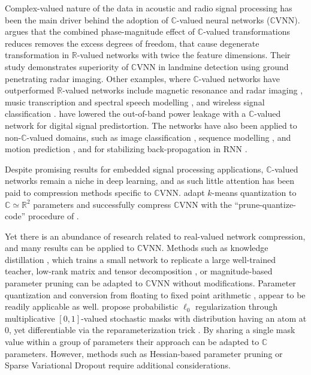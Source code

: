 \documentclass[a4paper,10pt,twocolumn]{article}
\newcommand{\real}{\mathbb{R}}
\newcommand{\cplx}{\mathbb{C}}
\begin{document}
Complex-valued nature of the data in acoustic and radio signal processing has been
the main driver behind the adoption of $\cplx$-valued neural networks ($\cplx$VNN).
\citet{hirose_complex-valued_2009} argues that the combined phase-magnitude effect of
$\cplx$-valued transformations reduces removes the excess degrees of freedom, that cause
degenerate transformation in $\real$-valued networks with twice the feature dimensions.
Their study demonstrates superiority of $\cplx$VNN in landmine detection using ground
penetrating radar imaging. Other examples, where $\cplx$-valued networks have outperformed
$\real$-valued networks include magnetic resonance \citep{hui_mri_1995,wang_deepcomplexmri_2020}
and radar imaging \citep{haensch_complex-valued_2010,zhang_complex-valued_2017}, music
transcription and spectral speech modelling \citep{wisdom_full-capacity_2016,trabelsi_deep_2018},
and wireless signal classification \citep{yang_complex_2019}. \citet{tarver_design_2019}
have lowered the out-of-band power leakage with a $\cplx$-valued network for digital
signal predistortion. The networks have also been applied to non-$\cplx$-valued domains,
such as image classification \citep{popa_complex-valued_2017}, sequence modelling
\citep{danihelka_associative_2016}, and motion prediction \citep{wolter_complex_2018},
and for stabilizing back-propagation in RNN \citep{wisdom_full-capacity_2016}.

Despite promising results for embedded signal processing applications, $\cplx$-valued
networks remain a niche in deep learning, and as such little attention has been paid
to compression methods specific to $\cplx$VNN. \citet{wu_compressing_2019} adapt $k$-means
quantization to $\cplx \simeq \real^2$ parameters and successfully compress $\cplx$VNN
with the ``prune-quantize-code'' procedure of \citet{han_deep_2016}.

Yet there is an abundance of research related to real-valued network compression, and
many results can be applied to $\cplx$VNN. Methods such as knowledge distillation
\citep{hinton_distilling_2015}, which trains a small network to replicate a large
well-trained teacher, low-rank matrix \citep{denton_exploiting_2014} and tensor decomposition
\citep{novikov_tensorizing_2015}, or magnitude-based parameter pruning \citep{zhu_prune_2018}
can be adapted to $\cplx$VNN without modifications. Parameter quantization and conversion
from floating to fixed point arithmetic \citep{courbariaux_training_2015,uhlich_mixed_2020},
appear to be readily applicable as well. \citet{louizos_learning_2018} propose probabilistic
$\ell_0$ regularization through multiplicative $[0, 1]$-valued stochastic masks with
distribution having an atom at $0$, yet differentiable via the reparameterization trick
\citep{kingma_auto-encoding_2014}. By sharing a single mask value within a group of
parameters their approach can be adapted to $\cplx$ parameters. However, methods such
as Hessian-based parameter pruning \citep{lecun_optimal_1990} or Sparse Variational Dropout
\citep{molchanov_variational_2017} require additional considerations.
\end{document}
